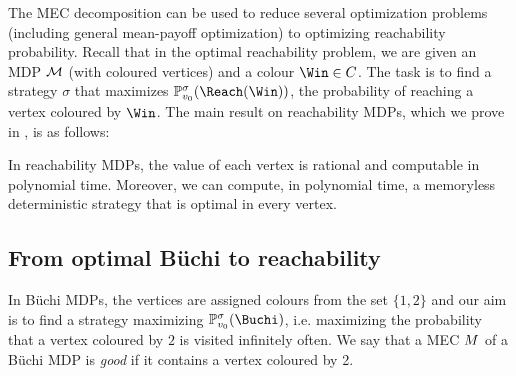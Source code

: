 The MEC decomposition can be used to reduce several optimization problems (including general mean-payoff optimization) to optimizing reachability probability. Recall that in the optimal reachability problem, we are given an MDP $\mathcal{M}$ (with coloured vertices) and a colour $\Win \in\colours$. The task is to find a strategy $\sigma$ that maximizes $ \probm^\sigma_{\vinit}(\Reach(\Win))$, the probability of reaching a vertex coloured by $\Win$. The main result on reachability MDPs, which we prove in , is as follows:

\begin{theorem}
\label{5-thm:quant-reachability-main}
In reachability MDPs, the value of each vertex is rational and computable in polynomial time. Moreover, we can compute, in polynomial time, a memoryless deterministic strategy that is optimal in every vertex.
\end{theorem}

\subsection*{From optimal B{\"u}chi to reachability}


In B{\"u}chi MDPs, the vertices are assigned colours from the set $\{1,2\}$ and our aim is to find a strategy maximizing $ \probm^\sigma_{\vinit}(\Buchi)$, i.e. maximizing the probability that a vertex coloured by $2$ is visited infinitely often.
We say that a MEC $M$ of a B{\"u}chi MDP is \emph{good} if it contains a vertex coloured by 2.

